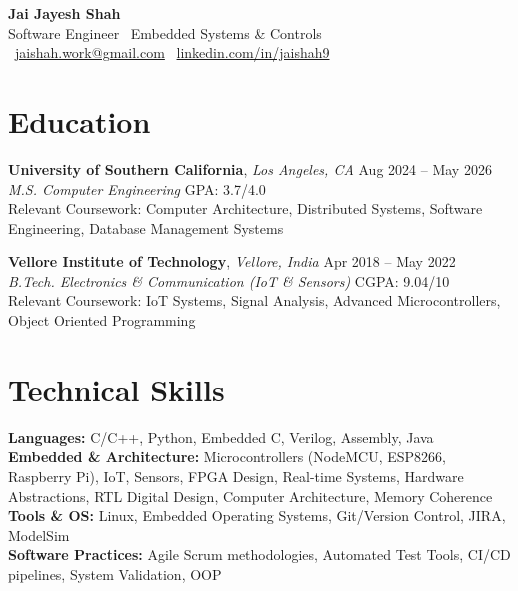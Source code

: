 \documentclass[letterpaper,11pt]{article}
\begin{document}
\begin{center}
    {\LARGE \textbf{Jai Jayesh Shah}}\\
    {\normalsize Software Engineer \textbar\ Embedded Systems \& Controls}\\
    \small
    \faEnvelope\ \href{mailto:jaishah.work@gmail.com}{jaishah.work@gmail.com}
    \quad
    \faLinkedin\ \href{https://www.linkedin.com/in/jaishah9}{linkedin.com/in/jaishah9}
\end{center}
\vspace{-13pt}


\section*{Education}
\textbf{University of Southern California}, \textit{Los Angeles, CA} \hfill Aug 2024 -- May 2026 \\
\textit{M.S. Computer Engineering} \hfill GPA: 3.7/4.0 \\
Relevant Coursework: Computer Architecture, Distributed Systems, Software Engineering, Database Management Systems

\textbf{Vellore Institute of Technology}, \textit{Vellore, India }\hfill Apr 2018 -- May 2022 \\
\textit{B.Tech. Electronics \& Communication (IoT \& Sensors)} \hfill CGPA: 9.04/10 \\
Relevant Coursework: IoT Systems, Signal Analysis, Advanced Microcontrollers, Object Oriented Programming


\section*{Technical Skills}
\textbf{Languages:} C/C++, Python, Embedded C, Verilog, Assembly, Java \\
\textbf{Embedded \& Architecture:} Microcontrollers (NodeMCU, ESP8266, Raspberry Pi), IoT, Sensors, FPGA Design, Real-time Systems, Hardware Abstractions, RTL Digital Design, Computer Architecture, Memory Coherence \\
\textbf{Tools \& OS:} Linux, Embedded Operating Systems, Git/Version Control, JIRA, ModelSim \\
\textbf{Software Practices:} Agile Scrum methodologies, Automated Test Tools, CI/CD pipelines, System Validation, OOP


\end{document}
